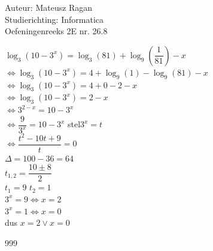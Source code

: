 \documentclass[a4paper]{article}
\begin{document}
\noindent \large Auteur: Mateusz Ragan \\
\noindent \large Studierichting: Informatica\\
\noindent \large Oefeningenreeks 2E nr. 26.8\\

\medskip

\normalsize

$\log_{3}(10-3^x) = \log_{3}(81) + \log_{9}\left(\dfrac{1}{81}\right)-x$\\

$\Leftrightarrow \log_{3}(10-3^x) = 4 + \log_{9}(1)-\log_{9}(81)-x$\\

$\Leftrightarrow \log_{3}(10-3^x) = 4 + 0 - 2 - x$\\

$\Leftrightarrow \log_{3}(10-3^x) = 2-x$\\

$\Leftrightarrow 3^{2-x} = 10-3^x$\\

$\Leftrightarrow \dfrac{9}{3^x} = 10-3^x$ stel$3^x = t$\\

$\Leftrightarrow \dfrac{t^2-10t+9}{t} = 0$\\

$\Delta = 100-36 = 64$\\

$t_{1,2} = \dfrac{10\pm8}{2}$\\

$t_{1} = 9$ $t_{2} = 1$\\

$3^x = 9 \Leftrightarrow x = 2$\\

$3^x = 1 \Leftrightarrow x = 0$\\

dus $x = 2 \vee x = 0$




\begin{thebibliography}{999}
\end{thebibliography}
\end{document}
